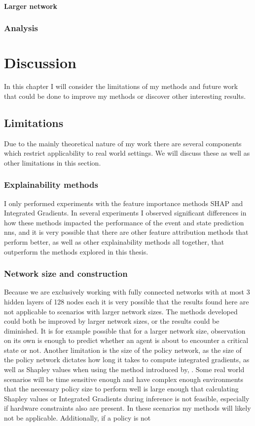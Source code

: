 \documentclass[UKenglish]{uiomasterthesis}
\begin{document}
\subsubsection{Larger network}

\subsection{Analysis}




\chapter{Discussion}
In this chapter I will consider the limitations of my methods and future work that could be done to improve my methods or discover other interesting results.

\section{Limitations}
Due to the mainly theoretical nature of my work there are several components which restrict applicability to real world settings. We will discuss these as well as other limitations in this section.

\subsection{Explainability methods}
I only performed experiments with the feature importance methods SHAP and Integrated Gradients. In several experiments I observed significant differences in how these methods impacted the performance of the event and state prediction \acp{nn}, and it is very possible that there are other feature attribution methods that perform better, as well as other explainability methods all together, that outperform the methods explored in this thesis.

\subsection{Network size and construction}
Because we are exclusively working with fully connected networks with at most 3 hidden layers of 128 nodes each it is very possible that the results found here are not applicable to scenarios with larger network sizes. The methods developed could both be improved by larger network sizes, or the results could be diminished. It is for example possible that for a larger network size, observation on its own is enough to predict whether an agent is about to encounter a critical state or not. 
Another limitation is the size of the policy network, as the size of the policy network dictates how long it takes to compute integrated gradients, as well as Shapley values when using the method introduced by,  . Some real world scenarios will be time sensitive enough and have complex enough environments that the necessary policy size to perform well is large enough that calculating Shapley values or Integrated Gradients during inference is not feasible, especially if hardware constraints also are present. In these scenarios my methods will likely not be applicable.
Additionally, if a policy is not
\end{document}
